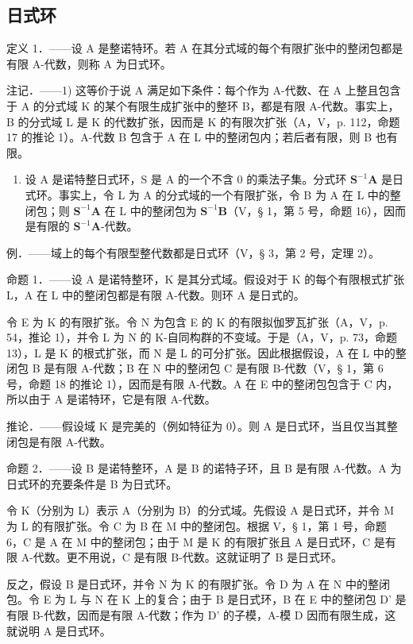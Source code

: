 \subsection{日式环}

定义 1．——设 A 是整诺特环。若 A 在其分式域的每个有限扩张中的整闭包都是有限 A-代数，则称 A 为日式环。

注记．——1) 这等价于说 A 满足如下条件：每个作为 A-代数、在 A 上整且包含于 A 的分式域 K 的某个有限生成扩张中的整环 B，都是有限 A-代数。事实上，B 的分式域 L 是 K 的代数扩张，因而是 K 的有限次扩张（A，V，p. 112，命题 17 的推论 1）。A-代数 B 包含于 A 在 L 中的整闭包内；若后者有限，则 B 也有限。

\begin{enumerate}
\def\labelenumi{\arabic{enumi})}
\setcounter{enumi}{1}
\tightlist
\item
  设 A 是诺特整日式环，S 是 A 的一个不含 0 的乘法子集。分式环 \(\mathbf{S}^{-1}\mathbf{A}\) 是日式环。事实上，令 L 为 A 的分式域的一个有限扩张，令 B 为 A 在 L 中的整闭包；则 \(\mathbf{S}^{-1}\mathbf{A}\) 在 L 中的整闭包为 \(\mathbf{S}^{-1}\mathbf{B}\)（V，§ 1，第 5 号，命题 16），因而是有限的 \(\mathbf{S}^{-1}\mathbf{A}\)-代数。
\end{enumerate}

例．——域上的每个有限型整代数都是日式环（V，§ 3，第 2 号，定理 2）。

命题 1．——设 A 是诺特整环，K 是其分式域。假设对于 K 的每个有限根式扩张 L，A 在 L 中的整闭包都是有限 A-代数。则环 A 是日式的。

令 E 为 K 的有限扩张。令 N 为包含 E 的 K 的有限拟伽罗瓦扩张（A，V，p. 54，推论 1），并令 L 为 N 的 K-自同构群的不变域。于是（A，V，p. 73，命题 13），L 是 K 的根式扩张，而 N 是 L 的可分扩张。因此根据假设，A 在 L 中的整闭包 B 是有限 A-代数；B 在 N 中的整闭包 C 是有限 B-代数（V，§ 1，第 6 号，命题 18 的推论 1），因而是有限 A-代数。A 在 E 中的整闭包包含于 C 内，所以由于 A 是诺特环，它是有限 A-代数。

推论．——假设域 K 是完美的（例如特征为 0）。则 A 是日式环，当且仅当其整闭包是有限 A-代数。

命题 2．——设 B 是诺特整环，A 是 B 的诺特子环，且 B 是有限 A-代数。A 为日式环的充要条件是 B 为日式环。

令 K（分别为 L）表示 A（分别为 B）的分式域。先假设 A 是日式环，并令 M 为 L 的有限扩张。令 C 为 B 在 M 中的整闭包。根据 V，§ 1，第 1 号，命题 6，C 是 A 在 M 中的整闭包；由于 M 是 K 的有限扩张且 A 是日式环，C 是有限 A-代数。更不用说，C 是有限 B-代数。这就证明了 B 是日式环。

反之，假设 B 是日式环，并令 N 为 K 的有限扩张。令 D 为 A 在 N 中的整闭包。令 E 为 L 与 N 在 K 上的复合；由于 B 是日式环，B 在 E 中的整闭包 D' 是有限 B-代数，因而是有限 A-代数；作为 D' 的子模，A-模 D 因而有限生成，这就说明 A 是日式环。

